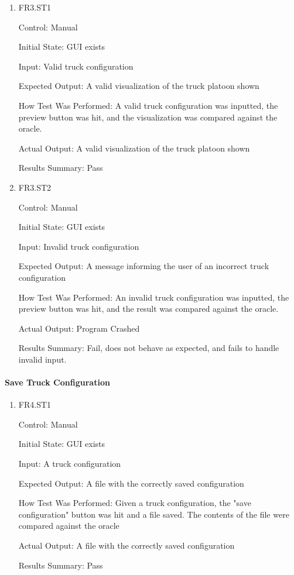 \documentclass[12pt, titlepage]{article}
\begin{document}
\begin{enumerate}

  \item{FR3.ST1\\}

  Control: Manual

  Initial State: GUI exists

  Input: Valid truck configuration

  Expected Output: A valid visualization of the truck platoon shown

  How Test Was Performed: A valid truck configuration was inputted, the preview button was hit, and the visualization was compared against the oracle.

  Actual Output: A valid visualization of the truck platoon shown

  Results Summary: Pass

  \item{FR3.ST2\\}

  Control: Manual

  Initial State: GUI exists

  Input: Invalid truck configuration

  Expected Output: A message informing the user of an incorrect truck configuration

  How Test Was Performed: An invalid truck configuration was inputted, the preview button was hit, and the result was compared against the oracle.

  Actual Output: Program Crashed

  Results Summary: Fail, does not behave as expected, and fails to handle invalid input.

\end{enumerate}

\paragraph{Save Truck Configuration}

\begin{enumerate}

  \item{FR4.ST1\\}

  Control: Manual

  Initial State: GUI exists

  Input: A truck configuration

  Expected Output: A file with the correctly saved configuration

  How Test Was Performed: Given a truck configuration, the "save configuration" button was hit and a file saved. The contents of the file were compared against the oracle

  Actual Output: A file with the correctly saved configuration

  Results Summary: Pass

\end{enumerate}
\end{document}
